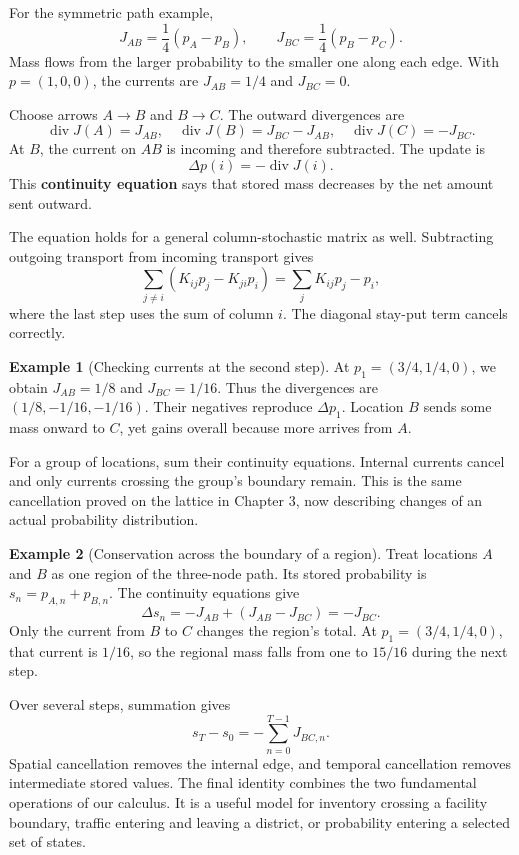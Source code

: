 \documentclass[11pt,oneside,openany]{book}
\theoremstyle{definition}
\newtheorem{example}{Example}[chapter]
\theoremstyle{remark}
\numberwithin{equation}{chapter}
\begin{document}
For the symmetric path example, \[J_{AB}=\frac14(p_A-p_B),\qquad
J_{BC}=\frac14(p_B-p_C).\] Mass flows from the larger probability to the smaller one along each edge. With \(p=(1,0,0)\), the currents are \(J_{AB}=1/4\) and \(J_{BC}=0\).

Choose arrows \(A\to B\) and \(B\to C\). The outward divergences are \[\operatorname{div}J(A)=J_{AB},\quad
\operatorname{div}J(B)=J_{BC}-J_{AB},\quad
\operatorname{div}J(C)=-J_{BC}.\] At \(B\), the current on \(AB\) is incoming and therefore subtracted. The update is \[\boxed{\Delta p(i)=-\operatorname{div}J(i).}\] This \textbf{continuity equation} says that stored mass decreases by the net amount sent outward.

The equation holds for a general column-stochastic matrix as well. Subtracting outgoing transport from incoming transport gives \[\sum_{j\ne i}(K_{ij}p_j-K_{ji}p_i)
=\sum_jK_{ij}p_j-p_i,\] where the last step uses the sum of column \(i\). The diagonal stay-put term cancels correctly.

\begin{example}[Checking currents at the second step]

At \(p_1=(3/4,1/4,0)\), we obtain \(J_{AB}=1/8\) and \(J_{BC}=1/16\). Thus the divergences are \((1/8,-1/16,-1/16)\). Their negatives reproduce \(\Delta p_1\). Location \(B\) sends some mass onward to \(C\), yet gains overall because more arrives from \(A\).

\end{example}

For a group of locations, sum their continuity equations. Internal currents cancel and only currents crossing the group's boundary remain. This is the same cancellation proved on the lattice in Chapter 3, now describing changes of an actual probability distribution.

\begin{example}[Conservation across the boundary of a region]

Treat locations \(A\) and \(B\) as one region of the three-node path. Its stored probability is \(s_n=p_{A,n}+p_{B,n}\). The continuity equations give \[\Delta s_n=-J_{AB}+(J_{AB}-J_{BC})=-J_{BC}.\] Only the current from \(B\) to \(C\) changes the region's total. At \(p_1=(3/4,1/4,0)\), that current is \(1/16\), so the regional mass falls from one to \(15/16\) during the next step.

\end{example}

Over several steps, summation gives \[s_T-s_0=-\sum_{n=0}^{T-1}J_{BC,n}.\] Spatial cancellation removes the internal edge, and temporal cancellation removes intermediate stored values. The final identity combines the two fundamental operations of our calculus. It is a useful model for inventory crossing a facility boundary, traffic entering and leaving a district, or probability entering a selected set of states.
\end{document}
